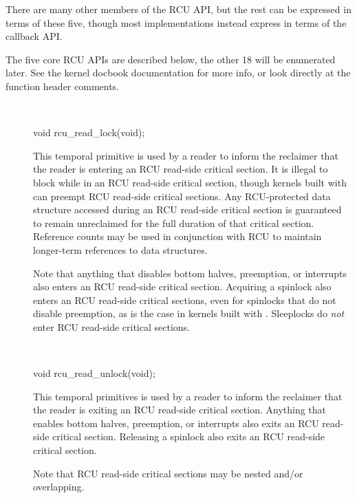 There are many other members of the RCU API, but the rest can be
expressed in terms of these five, though most implementations instead
express  in terms of the  callback API\@.

The five core RCU APIs are described below, the other 18 will be enumerated
later.
See the kernel docbook documentation for more info, or look directly
at the function header comments.

\begin{description}
\item[] {~}

\begin{VerbatimU}
	void rcu_read_lock(void);
\end{VerbatimU}

	This temporal primitive is used by a reader to inform the
	reclaimer that the reader is entering an RCU read-side critical
	section.
	It is illegal to block while in an RCU read-side
	critical section, though kernels built with 
	can preempt RCU read-side critical sections.
	Any RCU-protected
	data structure accessed during an RCU read-side critical section
	is guaranteed to remain unreclaimed for the full duration of that
	critical section.
	Reference counts may be used in conjunction
	with RCU to maintain longer-term references to data structures.

	Note that anything that disables bottom halves, preemption,
	or interrupts also enters an RCU read-side critical section.
	Acquiring a spinlock also enters an RCU read-side critical
	sections, even for spinlocks that do not disable preemption,
	as is the case in kernels built with .
	Sleeplocks do \emph{not} enter RCU read-side critical sections.

\item[] {~}

\begin{VerbatimU}
	void rcu_read_unlock(void);
\end{VerbatimU}

	This temporal primitives is used by a reader to inform the
	reclaimer that the reader is exiting an RCU read-side critical
	section.
	Anything that enables bottom halves, preemption,
	or interrupts also exits an RCU read-side critical section.
	Releasing a spinlock also exits an RCU read-side critical section.

	Note that RCU read-side critical sections may be nested and/or
	overlapping.


\end{description}
